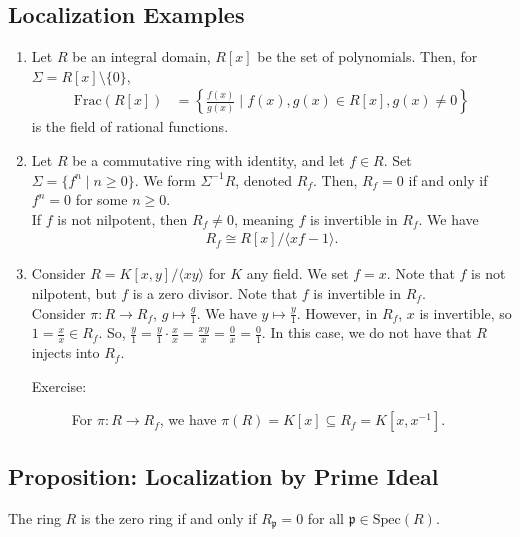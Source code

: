 \documentclass[10pt]{extarticle}
\begin{document}
  \subsection{Localization Examples}%
  \begin{enumerate}[(1)]
    \item Let $R$ be an integral domain, $R[x]$ be the set of polynomials. Then, for $\Sigma = R[x]\setminus \{0\}$,
      \begin{align*}
        \text{Frac}(R[x]) &= \left\{\frac{f(x)}{g(x)}\mid f(x),g(x)\in R[x],g(x)\neq 0\right\}
      \end{align*}
      is the field of rational functions.
    \item Let $R$ be a commutative ring with identity, and let $f\in R$. Set $\Sigma = \{f^{n}\mid n\geq 0\}$. We form $\Sigma^{-1}R $, denoted $ R_{f}$. Then, $R_f = 0$ if and only if $f^{n} = 0$ for some $n\geq 0$.\\

      If $f$ is not nilpotent, then $R_f \neq 0$, meaning $f$ is invertible in $R_f$. We have
      \begin{align*}
        R_f \cong R[x]/\langle xf-1\rangle.
      \end{align*}
    \item Consider $R = K[x,y]/\langle xy\rangle$ for $K$ any field. We set $f = x$. Note that $f$ is not nilpotent, but $f$ is a zero divisor. Note that $f$ is invertible in $R_f$.\\

      Consider $\pi: R\rightarrow R_f$, $g \mapsto \frac{g}{1}$. We have $y\mapsto \frac{y}{1}$. However, in $R_f$, $x$ is invertible, so $1=\frac{x}{x}\in R_f$. So, $\frac{y}{1} = \frac{y}{1}\cdot \frac{x}{x} = \frac{xy}{x} = \frac{0}{x} = \frac{0}{1}$. In this case, we do not have that $R$ injects into $R_f$.
      \begin{description}
        \item[Exercise:] For $\pi: R\rightarrow R_f$, we have $\pi(R) = K[x]\subseteq R_f = K[x,x^{-1}]$.
      \end{description}
  \end{enumerate}
  \subsection{Proposition: Localization by Prime Ideal}%
  The ring $R$ is the zero ring if and only if $R_\mathfrak{p} = 0$ for all $\mathfrak{p}\in \text{Spec}(R)$.\\
\end{document}
